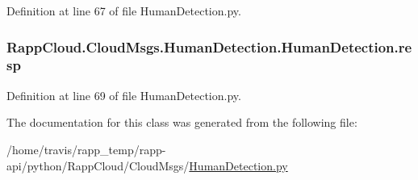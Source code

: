 Definition at line 67 of file Human\-Detection.\-py.

\hypertarget{classRappCloud_1_1CloudMsgs_1_1HumanDetection_1_1HumanDetection_a1167292691f49487b22f2b752592755c}{
\subsubsection[{resp}]{\setlength{\rightskip}{0pt plus 5cm}Rapp\-Cloud.\-Cloud\-Msgs.\-Human\-Detection.\-Human\-Detection.\-resp}}\label{classRappCloud_1_1CloudMsgs_1_1HumanDetection_1_1HumanDetection_a1167292691f49487b22f2b752592755c}


Definition at line 69 of file Human\-Detection.\-py.



The documentation for this class was generated from the following file\-:\begin{DoxyCompactItemize}
\item 
/home/travis/rapp\-\_\-temp/rapp-\/api/python/\-Rapp\-Cloud/\-Cloud\-Msgs/\hyperlink{HumanDetection_8py}{Human\-Detection.\-py}\end{DoxyCompactItemize}
